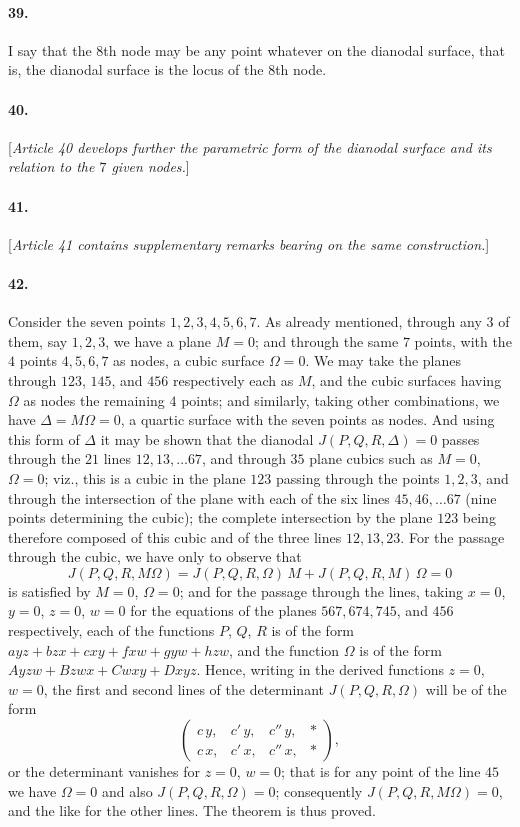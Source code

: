 \documentclass[11pt,a4paper]{article}
\begin{document}
\paragraph{39.}
I say that the $8$th node may be any point whatever on the dianodal surface, that is,
the dianodal surface is the locus of the $8$th node.

\paragraph{40.}
[\textit{Article 40 develops further the parametric form of the dianodal surface and
its relation to the $7$ given nodes.}]

\paragraph{41.}
[\textit{Article 41 contains supplementary remarks bearing on the same construction.}]

\paragraph{42.}
Consider the seven points $1, 2, 3, 4, 5, 6, 7$. As already mentioned, through any $3$
of them, say $1, 2, 3$, we have a plane $M = 0$; and through the same $7$ points, with
the $4$ points $4, 5, 6, 7$ as nodes, a cubic surface $\Omega = 0$. We may take the planes
through $123$, $145$, and $456$ respectively each as $M$, and the cubic surfaces having
$\Omega$ as nodes the remaining $4$ points; and similarly, taking other combinations,
we have $\Delta = M \Omega = 0$, a quartic surface with the seven points as nodes. And
using this form of $\Delta$ it may be shown that the dianodal $J(P, Q, R, \Delta) = 0$
passes through the $21$ lines $12, 13, \ldots 67$, and through $35$ plane cubics such as
$M = 0$, $\Omega = 0$; viz., this is a cubic in the plane $123$ passing through the points
$1, 2, 3$, and through the intersection of the plane with each of the six lines
$45, 46, \ldots 67$ (nine points determining the cubic); the complete intersection by the
plane $123$ being therefore composed of this cubic and of the three lines $12, 13, 23$.
For the passage through the cubic, we have only to observe that
\[
J(P, Q, R, M \Omega) = J(P, Q, R, \Omega)\,M + J(P, Q, R, M)\,\Omega = 0
\]
is satisfied by $M = 0$, $\Omega = 0$; and for the passage through the lines, taking
$x = 0$, $y = 0$, $z = 0$, $w = 0$ for the equations of the planes $567, 674, 745$, and
$456$ respectively, each of the functions $P$, $Q$, $R$ is of the form
$a y z + b z x + c x y + f x w + g y w + h z w$, and the function $\Omega$ is of the form
$A y z w + B z w x + C w x y + D x y z$. Hence, writing in the derived functions $z = 0$,
$w = 0$, the first and second lines of the determinant $J(P, Q, R, \Omega)$ will be of the
form
\[
\begin{pmatrix}
c\,y, & c'\,y, & c''\,y, & * \\
c\,x, & c'\,x, & c''\,x, & *
\end{pmatrix},
\]
or the determinant vanishes for $z = 0$, $w = 0$; that is for any point of the line $45$
we have $\Omega = 0$ and also $J(P, Q, R, \Omega) = 0$; consequently
$J(P, Q, R, M \Omega) = 0$, and the like for the other lines. The theorem is thus proved.
\end{document}
